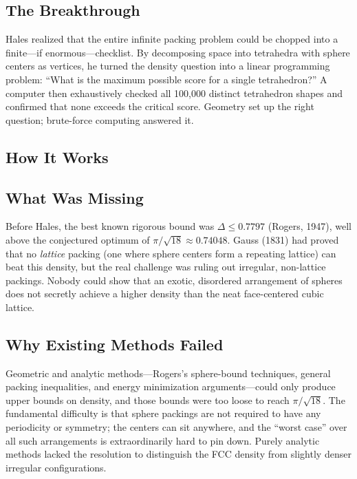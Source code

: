 \subsection{The Breakthrough}
Hales realized that the entire infinite packing problem could be chopped into a finite---if enormous---checklist. By decomposing space into tetrahedra with sphere centers as vertices, he turned the density question into a linear programming problem: ``What is the maximum possible score for a single tetrahedron?'' A computer then exhaustively checked all 100,000 distinct tetrahedron shapes and confirmed that none exceeds the critical score. Geometry set up the right question; brute-force computing answered it.

\subsection{How It Works}

\subsection{What Was Missing}
Before Hales, the best known rigorous bound was $\Delta \leq 0.7797$ (Rogers, 1947), well above the conjectured optimum of $\pi/\sqrt{18} \approx 0.74048$. Gauss (1831) had proved that no \emph{lattice} packing (one where sphere centers form a repeating lattice) can beat this density, but the real challenge was ruling out irregular, non-lattice packings. Nobody could show that an exotic, disordered arrangement of spheres does not secretly achieve a higher density than the neat face-centered cubic lattice.

\subsection{Why Existing Methods Failed}
Geometric and analytic methods---Rogers's sphere-bound techniques, general packing inequalities, and energy minimization arguments---could only produce upper bounds on density, and those bounds were too loose to reach $\pi/\sqrt{18}$. The fundamental difficulty is that sphere packings are not required to have any periodicity or symmetry; the centers can sit anywhere, and the ``worst case'' over all such arrangements is extraordinarily hard to pin down. Purely analytic methods lacked the resolution to distinguish the FCC density from slightly denser irregular configurations.

